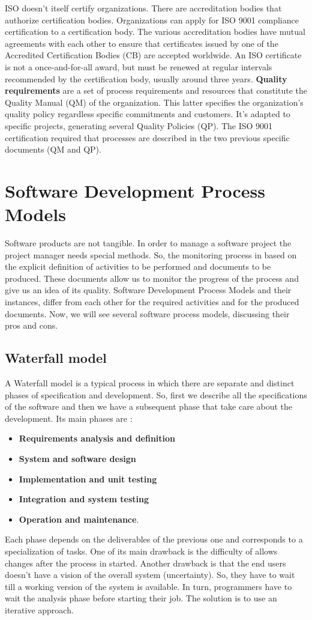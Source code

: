 \documentclass[11pt]{article}
\begin{document}
ISO doesn't itself certify organizations. There are accreditation bodies that authorize certification bodies. Organizations can apply for ISO 9001 compliance certification to a certification body. The various accreditation bodies have mutual agreements with each other to ensure that certificates issued by one of the Accredited Certification Bodies (CB) are accepted worldwide. An ISO certificate is not a once-and-for-all award, but must be renewed at regular intervals recommended by the certification body, usually around three years. \textbf{Quality requirements} are a set of process requirements and resources that constitute the Quality Manual (QM) of the organization. This latter specifies the organization's quality policy regardless specific commitments and customers. It's adapted to specific projects, generating several Quality Policies (QP). The ISO 9001 certification required that processes are described in the two previous specific documents (QM and QP).
\section{Software Development Process Models}
Software products are not tangible. In order to manage a software project the project manager needs special methods. So, the monitoring process in based on the explicit definition of activities to be performed and documents to be produced. These documents allow us to monitor the progress of the process and give us an idea of its quality. Software Development Process Models and their instances, differ from each other for the required activities and for the produced documents. Now, we will see several software process models, discussing their pros and cons.
\subsection{Waterfall model}
A Waterfall model is a typical process in which there are separate and distinct phases of specification and development. So, first we describe all the specifications of the software and then we have a subsequent phase that take care about the development. Its main phases are :
\begin{itemize}
\item \textbf{Requirements analysis and definition}
\item \textbf{System and software design}
\item \textbf{Implementation and unit testing}
\item \textbf{Integration and system testing}
\item \textbf{Operation and maintenance}.
\end{itemize}
Each phase depends on the deliverables of the previous one and corresponds to a specialization of tasks. One of its main drawback is the difficulty of allows changes after the process in started. Another drawback is that the end users doesn't have a vision of the overall system (uncertainty). So, they have to wait till a working version of the system is available. In turn, programmers have to wait the analysis phase before starting their job. The solution is to use an iterative approach.
\end{document}
